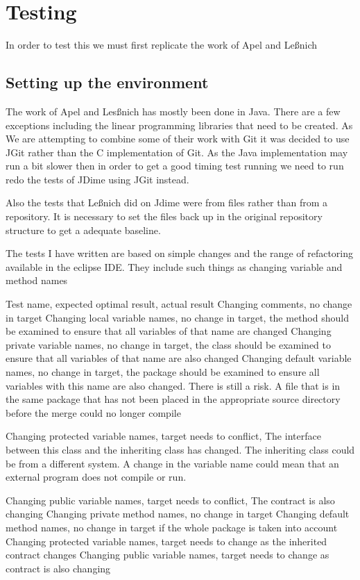 
\chapter{Testing}
In order to test this we must first replicate the work of Apel and Le{\ss}nich

\section{Setting up the environment}
The work of Apel and Les{\ss}nich has mostly been done in Java.  There are a few exceptions including the linear programming libraries that need to be created.  As We are attempting to combine some of their work with Git it was decided to use JGit rather than the C implementation of Git. As the Java implementation may run a bit slower then in order to get a good timing test running we need to run redo the tests of JDime using JGit instead. 

Also the tests that Le{\ss}nich did on Jdime were from files rather than from a repository. It is necessary to set the files back up in the original repository structure to get a adequate baseline.

The tests I have written are based on simple changes and the range of refactoring available in the eclipse IDE.  They include such things as changing variable and method names 

Test name, expected optimal result, actual result
Changing comments, no change in target
Changing local variable names, no change in target, the method should be examined to ensure that all variables of that name are changed
Changing private variable names, no change in target,  the class should be examined to ensure that all variables of that name are also changed
Changing default variable names, no change in target, the  package should be examined to ensure all variables with this name are also changed. There is still a risk. A file that is in the same package that has not been placed in the appropriate source directory before the merge could no longer compile
 
Changing protected variable names, target needs to conflict, The interface between this class and the inheriting class has changed.  The inheriting class could be from a different system.  A change in the variable name could mean that an external program does not compile or run.

Changing public variable names, target needs to conflict, The contract is also changing
Changing private method names, no change in target
Changing default method names, no change in target if the whole package is taken into account
Changing protected variable names, target needs to change as the inherited contract changes
Changing public variable names, target needs to change as contract is also changing 
